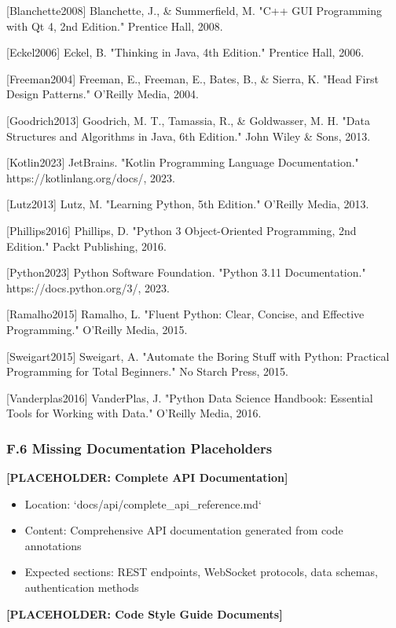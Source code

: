 \documentclass[11pt,a4paper]{article}
\begin{document}
{{[Blanchette2008] Blanchette, J., \& Summerfield, M. "C++ GUI Programming with Qt 4, 2nd Edition." Prentice Hall, 2008.

[Eckel2006] Eckel, B. "Thinking in Java, 4th Edition." Prentice Hall, 2006.

[Freeman2004] Freeman, E., Freeman, E., Bates, B., \& Sierra, K. "Head First Design Patterns." O'Reilly Media, 2004.

[Goodrich2013] Goodrich, M. T., Tamassia, R., \& Goldwasser, M. H. "Data Structures and Algorithms in Java, 6th Edition."
John Wiley \& Sons, 2013.

[Kotlin2023] JetBrains. "Kotlin Programming Language Documentation." https://kotlinlang.org/docs/, 2023.

[Lutz2013] Lutz, M. "Learning Python, 5th Edition." O'Reilly Media, 2013.

[Phillips2016] Phillips, D. "Python 3 Object-Oriented Programming, 2nd Edition." Packt Publishing, 2016.

[Python2023] Python Software Foundation. "Python 3.11 Documentation." https://docs.python.org/3/, 2023.

[Ramalho2015] Ramalho, L. "Fluent Python: Clear, Concise, and Effective Programming." O'Reilly Media, 2015.

[Sweigart2015] Sweigart, A. "Automate the Boring Stuff with Python: Practical Programming for Total Beginners." No
Starch Press, 2015.

[Vanderplas2016] VanderPlas, J. "Python Data Science Handbook: Essential Tools for Working with Data." O'Reilly Media,
2016.

\subsubsection{F.6 Missing Documentation Placeholders}

\textbf{[PLACEHOLDER: Complete API Documentation]}

\begin{itemize}
\item Location: `docs/api/complete_api_reference.md`
\item Content: Comprehensive API documentation generated from code annotations
\item Expected sections: REST endpoints, WebSocket protocols, data schemas, authentication methods

\end{itemize}
\textbf{[PLACEHOLDER: Code Style Guide Documents]}

}}
\end{document}
